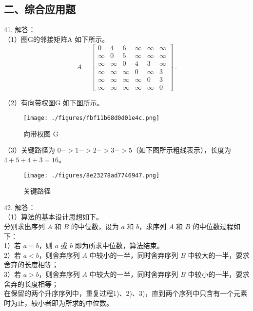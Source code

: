 \subsection{二、综合应用题}

41. 解答： \\
（1）图G的邻接矩阵A 如下所示。 \\
\begin{equation}
A=
\begin{bmatrix}
 0 & 4 & 6 & \infty & \infty & \infty \\
 \infty & 0 & 5 & \infty & \infty & \infty \\
 \infty & \infty & 0 & 4 & 3 & \infty \\
 \infty & \infty & \infty & 0 & \infty & 3 \\
 \infty & \infty & \infty & \infty & 0 & 3 \\
 \infty & \infty & \infty & \infty & \infty & 0 
\end{bmatrix}~.
\end{equation}


（2）有向带权图G 如下图所示。 \\
\begin{figure}[ht]
\centering
\texttt{[image: ./figures/fbf11b68d0d01e4c.png]}
\caption{向带权图 G} \label{fig_Na11_2}
\end{figure}

（3）关键路径为 $0->1->2->3->5$（如下图所示粗线表示），长度为 $4+5+4+3=16$。 \\
\begin{figure}[ht]
\centering
\texttt{[image: ./figures/8e23278ad7746947.png]}
\caption{关键路径} \label{fig_Na11_3}
\end{figure}

42. 解答： \\
（1）算法的基本设计思想如下。 \\
分别求出序列 $A$ 和 $B$ 的中位数，设为 $a$ 和 $b$，求序列 $A$ 和 $B$ 的中位数过程如下： \\
1）若 $a=b$，则 $a$ 或 $b$ 即为所求中位数，算法结束。 \\
2）若 $a<b$，则舍弃序列 $A$ 中较小的一半，同时舍弃序列 $B$ 中较大的一半，要求舍弃的长度相等； \\
3）若 $a>b$，则舍弃序列 $A$ 中较大的一半，同时舍弃序列 $B$ 中较小的一半，要求舍弃的长度相等； \\
在保留的两个升序序列中，重复过程1)、2)、3)，直到两个序列中只含有一个元素时为止，较小者即为所求的中位数。

